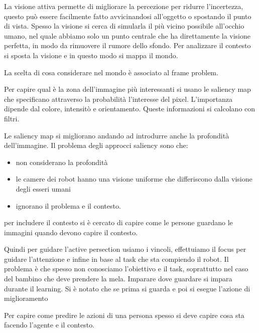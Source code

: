 La visione attiva permette di migliorare la percezione per ridurre l'incertezza,
questo può essere facilmente fatto avvicinandosi all'oggetto o spostando il punto di 
vista. Spesso la visione si cerca di simularla il più vicino possibile all'occhio 
umano, nel quale abbiamo solo un punto centrale che ha direttamente la visione perfetta,
in modo da rimuovere il rumore dello sfondo. Per analizzare il contesto si sposta 
la visione e in questo modo si mappa il mondo.

\begin{nota}
    La scelta di cosa considerare nel mondo è associato al frame problem.
\end{nota}

Per capire qual è la zona dell'immagine più interessanti si usano le saliency map 
che specificano attraverso la probabilità l'interesse del pixel. L'importanza 
dipende dal colore, intensitò e orientamento. Queste informazioni si calcolano con 
filtri.

Le saliency map si migliorano andando ad introdurre anche la profondità dell'immagine.
Il problema degli approcci saliency sono che:
\begin{itemize}
    \item non considerano la profondità
    \item le camere dei robot hanno una visione uniforme che differiscono dalla 
    visione degli esseri umani
    \item ignorano il problema e il contesto.
\end{itemize}

per includere il contesto si è cercato di capire come le persone guardano le immagini 
quando devono capire il contesto.

Quindi per guidare l'active persection usiamo i vincoli, effettuiamo il focus 
per guidare l'attenzione e infine in base al task che sta compiendo il robot.
Il problema è che spesso non conosciamo l'obiettivo e il task, soprattutto nel caso 
del bambino che deve prendere la mela. Imparare dove guardare si impara durante il 
learning. Si è notato che se prima si guarda e poi si esegue l'azione di miglioramento  

Per capire come predire le azioni di una persona spesso si deve capire cosa sta 
facendo l'agente e il contesto.